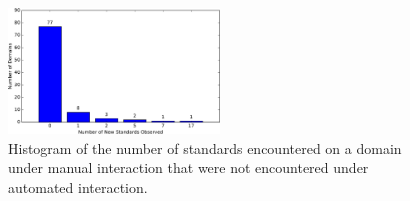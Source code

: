 \begin{figure}[h]
  \centering
  \includegraphics[width=0.5\textwidth]{figures/measurement_external_validation.pdf}
  \caption{Histogram of the number of standards encountered on a domain under manual interaction that were not encountered under automated interaction.}
  \label{fig:external-validation-figure}
\end{figure}